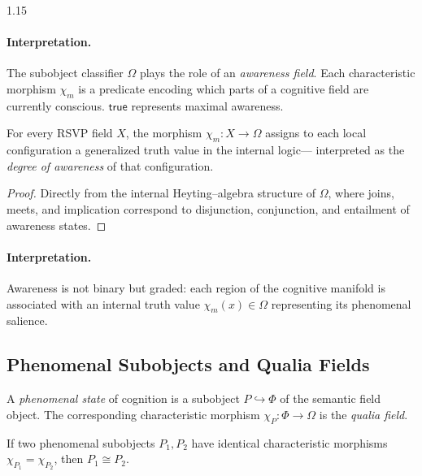\documentclass[12pt,a4paper]{article}
\begin{document}
\begin{spacing}{1.15}
\paragraph{Interpretation.}
The subobject classifier \(\Omega\) plays the role of an \emph{awareness field}.
Each characteristic morphism \(\chi_m\) is a predicate
encoding which parts of a cognitive field are currently conscious.
\(\mathsf{true}\) represents maximal awareness.

\begin{proposition}
\label{prop:aware}
For every RSVP field \(X\),
the morphism \(\chi_m : X \to \Omega\)
assigns to each local configuration
a generalized truth value in the internal logic—
interpreted as the \emph{degree of awareness} of that configuration.
\end{proposition}

\begin{proof}
Directly from the internal Heyting–algebra structure of \(\Omega\),
where joins, meets, and implication correspond to disjunction, conjunction,
and entailment of awareness states.
\end{proof}

\paragraph{Interpretation.}
Awareness is not binary but graded:
each region of the cognitive manifold
is associated with an internal truth value \(\chi_m(x)\in\Omega\)
representing its phenomenal salience.

\subsection{Phenomenal Subobjects and Qualia Fields}

\begin{definition}
\label{def:phenomenal}
A \emph{phenomenal state} of cognition is a subobject
\(P \hookrightarrow \Phi\)
of the semantic field object.
The corresponding characteristic morphism
\(\chi_P : \Phi \to \Omega\)
is the \emph{qualia field}.
\end{definition}

\begin{proposition}
\label{prop:unity}
If two phenomenal subobjects \(P_1,P_2\)
have identical characteristic morphisms
\(\chi_{P_1}=\chi_{P_2}\),
then \(P_1\cong P_2\).
\end{proposition}


\end{spacing}
\end{document}
